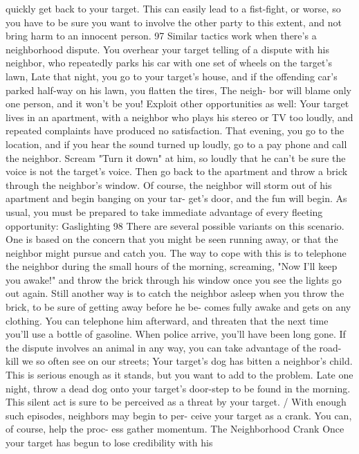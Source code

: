 \documentclass{book}
\begin{document}
quickly get back to your target. 
This can easily lead to a fist-fight, or worse, so you have to 
be sure you want to involve the other party to this extent, and 
not bring harm to an innocent person. 97 
Similar tactics work when there's a neighborhood dispute. 
You overhear your target telling of a dispute with 
his neighbor, who repeatedly parks his car with one set 
of wheels on the target's lawn, Late that night, you go 
to your target's house, and if the offending car's parked 
half-way on his lawn, you flatten the tires, The neigh- 
bor will blame only one person, and it won't be you! 
Exploit other opportunities as well: 
Your target lives in an apartment, with a neighbor 
who plays his stereo or TV too loudly, and repeated 
complaints have produced no satisfaction. That 
evening, you go to the location, and if you hear the 
sound turned up loudly, go to a pay phone and call the 
neighbor. Scream "Turn it down" at him, so loudly that 
he can't be sure the voice is not the target's voice. Then 
go back to the apartment and throw a brick through the 
neighbor's window. Of course, the neighbor will storm 
out of his apartment and begin banging on your tar- 
get's door, and the fun will begin. As usual, you must be prepared to take immediate advantage of 
every fleeting opportunity:  Gaslighting 
98 
There are several possible variants on this scenario. One is 
based on the concern that you might be seen running away, or 
that the neighbor might pursue and catch you. The way to cope 
with this is to telephone the neighbor during the small hours of 
the morning, screaming, "Now I'll keep you awake!" and throw 
the brick through his window once you see the lights go out 
again. Still another way is to catch the neighbor asleep when 
you throw the brick, to be sure of getting away before he be- 
comes fully awake and gets on any clothing. You can telephone 
him afterward, and threaten that the next time you'll use a bottle 
of gasoline. When police arrive, you'll have been long gone. 
If the dispute involves an animal in any way, you can take 
advantage of the road-kill we so often see on our streets; 
Your target's dog has bitten a neighbor's child. This 
is serious enough as it stands, but you want to add to 
the problem. Late one night, throw a dead dog onto 
your target's door-step to be found in the morning. This 
silent act is sure to be perceived as a threat by your 
target. 
/ With enough such episodes, neighbors may begin to per- 
ceive your target as a crank. You can, of course, help the proc- 
ess gather momentum. 
The Neighborhood Crank 
Once your target has begun to lose credibility with his 
\end{document}
